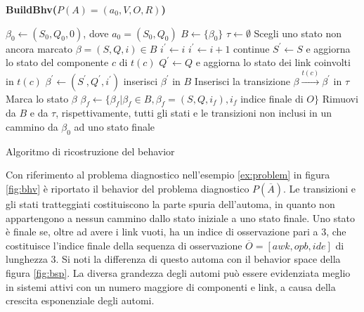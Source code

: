 \begin{algorithm}
\textbf{BuildBhv($P(A) = (a_0,V,O,R)$)}
\begin{algorithmic}
	\STATE $\beta_0 \leftarrow (S_0,Q_0,0)$, dove $a_0 = (S_0,Q_0)$
	\STATE $B \leftarrow \{\beta_0\}$
	\STATE $\tau \leftarrow \emptyset$
	\REPEAT
		\STATE Scegli uno stato non ancora marcato $\beta = (S,Q,i) \in B$
				\STATE $i^\prime \leftarrow i$
				\STATE $i^\prime \leftarrow i+1$
			\ELSE
				\STATE continue
			\ENDIF
			\STATE $S^\prime \leftarrow S$ e aggiorna lo stato del componente $c$ di $t(c)$
			\STATE $Q^\prime \leftarrow Q$ e aggiorna lo stato dei link coinvolti in $t(c)$
			\STATE $\beta^\prime \leftarrow (S^\prime,Q^\prime,i^\prime)$
				\STATE inserisci $\beta^\prime$ in $B$
			\ENDIF
			\STATE Inserisci la transizione $\beta \xrightarrow{t(c)} \beta^\prime$ in $\tau$
		\ENDFOR
		\STATE Marca lo stato $\beta$
	\STATE $\beta_f \leftarrow \{\beta_f | \beta_f \in B, \beta_f=(S,Q,i_f), i_f$  indice finale di $O\}$
	\STATE Rimuovi da $B$ e da $\tau$, rispettivamente, tutti gli stati e le transizioni non inclusi in un cammino da $\beta_0$ ad uno stato finale
\end{algorithmic}
\caption{Algoritmo di ricostruzione del behavior}
\label{alg:bhv}
\end{algorithm}

\begin{ex}
Con riferimento al problema diagnostico nell'esempio \ref{ex:problem} in figura \ref{fig:bhv} è riportato  il behavior del problema diagnostico $P(\overline{A})$. Le transizioni e gli stati tratteggiati costituiscono la parte spuria dell'automa, in quanto non appartengono a nessun cammino dallo stato iniziale a uno stato finale. Uno stato è finale se, oltre ad avere i link vuoti, ha un indice di osservazione pari a $3$, che costituisce l'indice finale della sequenza di osservazione $\overline{O} = [awk,opb,ide]$ di lunghezza $3$.
Si noti la differenza di questo automa con il behavior space della figura \ref{fig:bsp}. 
La diversa grandezza degli automi può essere evidenziata meglio in sistemi attivi con un numero maggiore di componenti e link, a causa della crescita esponenziale degli automi.
\end{ex}

